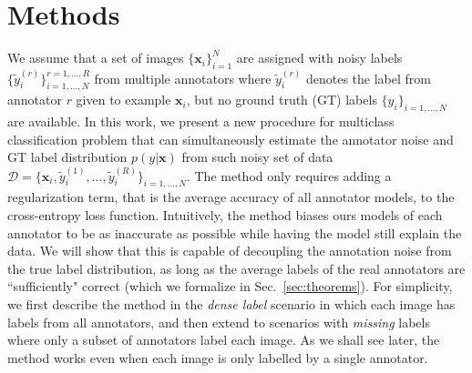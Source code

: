 \section{Methods}
 
We assume that a set of images $\{\mathbf{x}_i\}_{i=1}^N$ are assigned with noisy labels $\{\tilde{y}^{(r)}_{i}\}^{r=1,...,R}_{i=1,...,N}$ from multiple annotators where $\tilde{y}^{(r)}_{i}$ denotes the label from annotator $r$ given to example $\mathbf{x}_i$, but no ground truth (GT) labels $\{y_{i}\}_{i=1,...,N}$ are available. In this work, we present a new procedure for multiclass classification problem that can simultaneously estimate the annotator noise and GT label distribution $p(y|\mathbf{x})$ from such noisy set of data $\mathcal{D} = \{\textbf{x}_i, \tilde{y}^{(1)}_{i},...,\tilde{y}^{(R)}_{i}\}_{i=1,...,N}$. The method only requires adding a regularization term, that is the average accuracy of all annotator models, to the cross-entropy loss function. Intuitively, the method biases ours models of each annotator to be as inaccurate as possible while having the model still explain the data. We will show that this is capable of decoupling the annotation noise from the true label distribution, as long as the average labels of the real annotators are ``sufficiently" correct (which we formalize in Sec.~\ref{sec:theorems}). For simplicity, we first describe the method in the \textit{dense label} scenario in which each image has labels from all annotators, and then extend to scenarios with \textit{missing} labels where only a subset of annotators label each image. As we shall see later, the method works even when each image is only labelled by a single annotator. 


